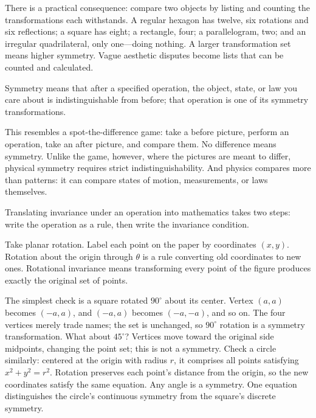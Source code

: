 There is a practical consequence: compare two objects by listing and counting the transformations each withstands. A regular hexagon has twelve, six rotations and six reflections; a square has eight; a rectangle, four; a parallelogram, two; and an irregular quadrilateral, only one---doing nothing. A larger transformation set means higher symmetry. Vague aesthetic disputes become lists that can be counted and calculated.


\begin{oneline}
Symmetry means that after a specified operation, the object, state, or law you care about is indistinguishable from before; that operation is one of its symmetry transformations.
\end{oneline}

This resembles a spot-the-difference game: take a before picture, perform an operation, take an after picture, and compare them. No difference means symmetry. Unlike the game, however, where the pictures are meant to differ, physical symmetry requires strict indistinguishability. And physics compares more than patterns: it can compare states of motion, measurements, or laws themselves.


Translating invariance under an operation into mathematics takes two steps: write the operation as a rule, then write the invariance condition.

Take planar rotation. Label each point on the paper by coordinates \((x,y)\). Rotation about the origin through \(\theta\) is a rule converting old coordinates to new ones. Rotational invariance means transforming every point of the figure produces exactly the original set of points.

The simplest check is a square rotated \(90^\circ\) about its center. Vertex \((a,a)\) becomes \((-a,a)\), and \((-a,a)\) becomes \((-a,-a)\), and so on. The four vertices merely trade names; the set is unchanged, so \(90^\circ\) rotation is a symmetry transformation. What about \(45^\circ\)? Vertices move toward the original side midpoints, changing the point set; this is not a symmetry. Check a circle similarly: centered at the origin with radius \(r\), it comprises all points satisfying \(x^2+y^2=r^2\). Rotation preserves each point's distance from the origin, so the new coordinates satisfy the same equation. Any angle is a symmetry. One equation distinguishes the circle's continuous symmetry from the square's discrete symmetry.

